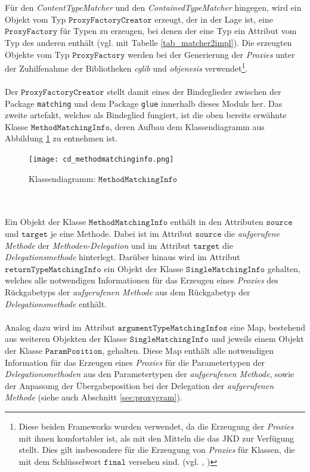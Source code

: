 \\\\
Für den \emph{ContentTypeMatcher} und den \emph{ContainedTypeMatcher} hingegen, wird ein Objekt vom Typ $\texttt{ProxyFactoryCreator}$ erzeugt, der in der Lage ist, eine $\texttt{ProxyFactory}$ für Typen zu erzeugen, bei denen der eine Typ ein Attribut vom Typ des anderen enthält (vgl. mit Tabelle \ref{tab_matcher2impl}). Die erzeugten Objekte vom Typ $\texttt{ProxyFactory}$ werden bei der Generierung der \emph{Proxies} unter der Zuhilfenahme der Bibliotheken \emph{cglib} und \emph{objenesis} verwendet\footnote{Diese beiden Frameworks wurden verwendet, da die Erzeugung der \emph{Proxies} mit ihnen komfortabler ist, als mit den Mitteln die das JKD zur Verfügung stellt. Dies gilt insbesondere für die Erzeugung von \emph{Proxies} für Klassen, die mit dem Schlüsselwort $\texttt{final}$ versehen sind. (vgl. \cite{objenesis}, \cite{cglib})}.
\\\\
Der $\texttt{ProxyFactoryCreator}$ stellt damit eines der Bindeglieder zwischen der Package \texttt{matching} und dem Package \texttt{glue} innerhalb dieses \Gls{Modul}s her. Das zweite \Gls{artefakt}, welches als Bindeglied fungiert, ist die oben bereits erwähnte Klasse $\texttt{MethodMatchingInfo}$, deren Aufbau dem Klassendiagramm aus Abbildung \ref{cd_methodMatchingInfo} zu entnehmen ist.
\begin{figure}[h!]
\texttt{[image: cd\_methodmatchinginfo.png]}
\caption{Klassendiagramm: $\texttt{MethodMatchingInfo}$}
\label{cd_methodMatchingInfo}
\end{figure}
\noindent
\\\\
Ein Objekt der Klasse $\texttt{MethodMatchingInfo}$ enthält in den Attributen $\texttt{source}$ und $\texttt{target}$ je eine Methode. Dabei ist im Attribut $\texttt{source}$ die \emph{aufgerufene Methode} der \emph{Methoden-Delegation} und im Attribut $\texttt{target}$ die \emph{Delegationsmethode} hinterlegt. Darüber hinaus wird im Attribut $\texttt{returnTypeMatchingInfo}$ ein Objekt der Klasse $\texttt{SingleMatchingInfo}$ gehalten, welches alle notwendigen Informationen für das Erzeugen eines \emph{Proxies} des Rückgabetyps der \emph{aufgerufenen Methode} aus dem Rückgabetyp der \emph{Delegationsmethode} enthält.
\\\\
Analog dazu wird im Attribut $\texttt{argumentTypeMatchingInfos}$ eine Map, bestehend aus weiteren Objekten der Klasse $\texttt{SingleMatchingInfo}$ und jeweils einem Objekt der Klasse $\texttt{ParamPosition}$, gehalten. Diese Map enthält alle notwendigen Information für das Erzeugen eines \emph{Proxies} für die Parametertypen der \emph{Delegationsmethoden} aus den Parametertypen der \emph{aufgerufenen Methode}, sowie der Anpassung der Übergabeposition bei der Delegation der \emph{aufgerufenen Methode} (siehe auch Abschnitt \ref{sec:proxygram}).
